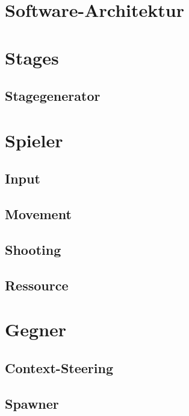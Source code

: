 \documentclass[a4paper,10pt,ngerman,fontsize=12pt]{scrreprt}
\begin{document}
\section{Software-Architektur}
\lipsum[3]



\section{Stages}
\lipsum[3]



\subsection{Stagegenerator}
\lipsum[3]


\section{Spieler}
\lipsum[3]



\subsection{Input}
\lipsum[3]


\subsection{Movement}
\lipsum[3]


\subsection{Shooting}
\lipsum[3]


\subsection{Ressource}
\lipsum[3]




\section{Gegner}
\lipsum[3]



\subsection{Context-Steering}
\lipsum[3]


\subsection{Spawner}
\lipsum[3]
\end{document}
